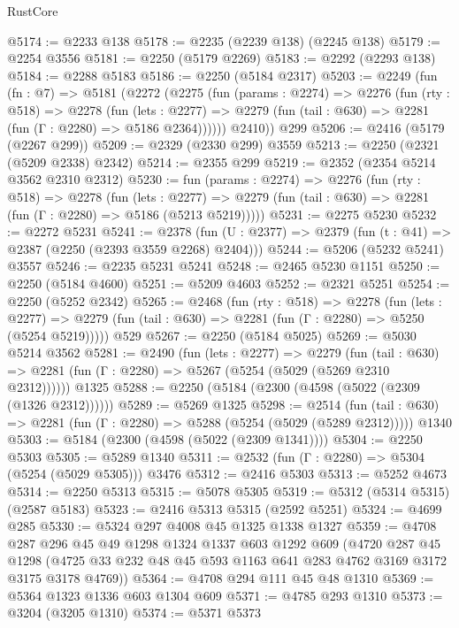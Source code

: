 \begin{lexlean}{RustCore}
\begin{coremodule}
@5174 := @2233 @138
@5178 := @2235 (@2239 @138) (@2245 @138)
@5179 := @2254 @3556
@5181 := @2250 (@5179 @2269)
@5183 := @2292 (@2293 @138)
@5184 := @2288 @5183
@5186 := @2250 (@5184 @2317)
@5203 := @2249
    (fun (fn : @7) =>
    @5181
      (@2272
        (@2275
          (fun (params : @2274) =>
          @2276
            (fun (rty : @518) =>
            @2278
              (fun (lets : @2277) =>
              @2279 (fun (tail : @630) => @2281 (fun (Γ : @2280) => @5186 @2364))))))
        @2410))
    @299
@5206 := @2416 (@5179 (@2267 @299))
@5209 := @2329 (@2330 @299) @3559
@5213 := @2250 (@2321 (@5209 @2338) @2342)
@5214 := @2355 @299
@5219 := @2352 (@2354 @5214 @3562 @2310 @2312)
@5230 := fun (params : @2274) =>
  @2276
    (fun (rty : @518) =>
    @2278
      (fun (lets : @2277) =>
      @2279 (fun (tail : @630) => @2281 (fun (Γ : @2280) => @5186 (@5213 @5219)))))
@5231 := @2275 @5230
@5232 := @2272 @5231
@5241 := @2378 (fun (U : @2377) => @2379 (fun (t : @41) => @2387 (@2250 (@2393 @3559 @2268) @2404)))
@5244 := @5206 (@5232 @5241) @3557
@5246 := @2235 @5231 @5241
@5248 := @2465 @5230 @1151
@5250 := @2250 (@5184 @4600)
@5251 := @5209 @4603
@5252 := @2321 @5251
@5254 := @2250 (@5252 @2342)
@5265 := @2468
    (fun (rty : @518) =>
    @2278
      (fun (lets : @2277) =>
      @2279 (fun (tail : @630) => @2281 (fun (Γ : @2280) => @5250 (@5254 @5219)))))
    @529
@5267 := @2250 (@5184 @5025)
@5269 := @5030 @5214 @3562
@5281 := @2490
    (fun (lets : @2277) =>
    @2279
      (fun (tail : @630) => @2281 (fun (Γ : @2280) => @5267 (@5254 (@5029 (@5269 @2310 @2312))))))
    @1325
@5288 := @2250 (@5184 (@2300 (@4598 (@5022 (@2309 (@1326 @2312))))))
@5289 := @5269 @1325
@5298 := @2514
    (fun (tail : @630) => @2281 (fun (Γ : @2280) => @5288 (@5254 (@5029 (@5289 @2312)))))
    @1340
@5303 := @5184 (@2300 (@4598 (@5022 (@2309 @1341))))
@5304 := @2250 @5303
@5305 := @5289 @1340
@5311 := @2532 (fun (Γ : @2280) => @5304 (@5254 (@5029 @5305))) @3476
@5312 := @2416 @5303
@5313 := @5252 @4673
@5314 := @2250 @5313
@5315 := @5078 @5305
@5319 := @5312 (@5314 @5315) (@2587 @5183)
@5323 := @2416 @5313 @5315 (@2592 @5251)
@5324 := @4699 @285
@5330 := @5324 @297 @4008 @45 @1325 @1338 @1327
@5359 := @4708
    @287
    @296
    @45
    @49
    @1298
    @1324
    @1337
    @603
    @1292
    @609
    (@4720
      @287
      @45
      @1298
      (@4725 @33 @232 @48 @45 @593 @1163 @641 @283 @4762 @3169 @3172 @3175 @3178 @4769))
@5364 := @4708 @294 @111 @45 @48 @1310
@5369 := @5364 @1323 @1336 @603 @1304 @609
@5371 := @4785 @293 @1310
@5373 := @3204 (@3205 @1310)
@5374 := @5371 @5373

\end{coremodule}
\end{lexlean}
